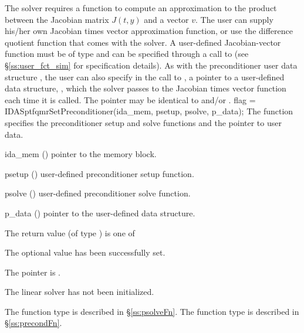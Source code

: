 The 
{\idasptfqmr} solver requires a function to compute an approximation to the
product between the Jacobian matrix $J(t,y)$ and a vector $v$.
The user can supply his/her own Jacobian times vector approximation function, 
or use the difference quotient function  
that comes with the {\idasptfqmr} solver.
A user-defined Jacobian-vector function must be of type  and 
can be specified through a call to  
(see \S\ref{ss:user_fct_sim} for specification details).
As with the preconditioner user data structure , 
the user can also specify in the call to , a pointer to a 
user-defined data structure, , which
the {\idasptfqmr} solver passes to the Jacobian times vector function 
each time it is called.  
The pointer  may be identical to  and/or .
{
  flag = IDASptfqmrSetPreconditioner(ida\_mem, psetup, psolve, p\_data);
}
{
  The function  specifies the preconditioner
  setup and solve functions and the pointer to user data.
}
{
  \begin{args}
  \item[ida\_mem] ()
    pointer to the {\ida} memory block.
  \item[psetup] ()
    user-defined preconditioner setup function.
  \item[psolve] ()
    user-defined preconditioner solve function.
  \item[p\_data] ()
     pointer to the user-defined data structure.
  \end{args}
}
{
  The return value  (of type ) is one of
  \begin{args}
  \item[\Id{IDASPTFQMR\_SUCCESS}] 
    The optional value has been successfully set.
  \item[\Id{IDASPTFQMR\_MEM\_NULL}]
    The  pointer is .
  \item[\Id{IDASPTFQMR\_LMEM\_NULL}]
    The {\idaspgmr} linear solver has not been initialized.
  \end{args}
}
{
   The function type  is described in \S\ref{ss:psolveFn}.
   The function type  is described in \S\ref{ss:precondFn}.
}
